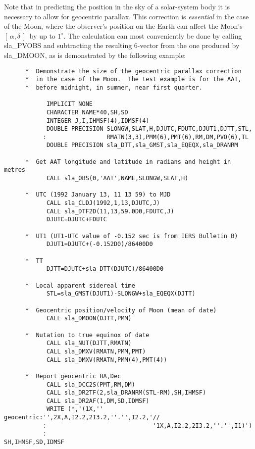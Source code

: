 \documentclass[11pt,twoside]{article}
\newcommand{\radec}     {$[\,\alpha,\delta\,]$}
\begin{document}
Note that in predicting the position in the sky of a solar-system body
it is necessary to allow for geocentric parallax.  This correction
is {\it essential}\/ in the case of the Moon, where the observer's
position on the Earth can affect the Moon's \radec\ by up to
$1^\circ$.  The calculation can most conveniently be done by calling
sla\_PVOBS and subtracting the resulting 6-vector from the
one produced by
sla\_DMOON, as is demonstrated by the following example:
\goodbreak
\begin{verbatim}
      *  Demonstrate the size of the geocentric parallax correction
      *  in the case of the Moon.  The test example is for the AAT,
      *  before midnight, in summer, near first quarter.

            IMPLICIT NONE
            CHARACTER NAME*40,SH,SD
            INTEGER J,I,IHMSF(4),IDMSF(4)
            DOUBLE PRECISION SLONGW,SLAT,H,DJUTC,FDUTC,DJUT1,DJTT,STL,
           :                 RMATN(3,3),PMM(6),PMT(6),RM,DM,PVO(6),TL
            DOUBLE PRECISION sla_DTT,sla_GMST,sla_EQEQX,sla_DRANRM

      *  Get AAT longitude and latitude in radians and height in metres
            CALL sla_OBS(0,'AAT',NAME,SLONGW,SLAT,H)

      *  UTC (1992 January 13, 11 13 59) to MJD
            CALL sla_CLDJ(1992,1,13,DJUTC,J)
            CALL sla_DTF2D(11,13,59.0D0,FDUTC,J)
            DJUTC=DJUTC+FDUTC

      *  UT1 (UT1-UTC value of -0.152 sec is from IERS Bulletin B)
            DJUT1=DJUTC+(-0.152D0)/86400D0

      *  TT
            DJTT=DJUTC+sla_DTT(DJUTC)/86400D0

      *  Local apparent sidereal time
            STL=sla_GMST(DJUT1)-SLONGW+sla_EQEQX(DJTT)

      *  Geocentric position/velocity of Moon (mean of date)
            CALL sla_DMOON(DJTT,PMM)

      *  Nutation to true equinox of date
            CALL sla_NUT(DJTT,RMATN)
            CALL sla_DMXV(RMATN,PMM,PMT)
            CALL sla_DMXV(RMATN,PMM(4),PMT(4))

      *  Report geocentric HA,Dec
            CALL sla_DCC2S(PMT,RM,DM)
            CALL sla_DR2TF(2,sla_DRANRM(STL-RM),SH,IHMSF)
            CALL sla_DR2AF(1,DM,SD,IDMSF)
            WRITE (*,'(1X,'' geocentric:'',2X,A,I2.2,2I3.2,''.'',I2.2,'//
           :                              '1X,A,I2.2,2I3.2,''.'',I1)')
           :                                                SH,IHMSF,SD,IDMSF


\end{verbatim}
\end{document}
